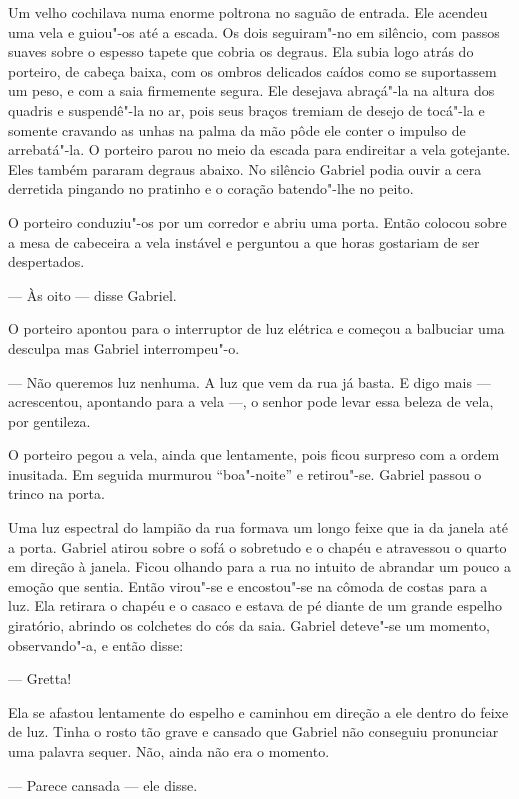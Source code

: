 Um velho cochilava numa enorme poltrona no saguão de entrada.  Ele acendeu uma
vela e guiou"-os até a escada.  Os dois seguiram"-no em silêncio, com passos
suaves sobre o espesso tapete que cobria os degraus.  Ela subia logo atrás do
porteiro, de cabeça baixa, com os ombros delicados caídos como se suportassem
um peso, e com a saia firmemente segura.  Ele desejava abraçá"-la na altura dos
quadris e suspendê"-la no ar, pois seus braços tremiam de desejo de tocá"-la e
somente cravando as unhas na palma da mão pôde ele conter o impulso de
arrebatá"-la.  O porteiro parou no meio da escada para endireitar a vela
gotejante.  Eles também pararam degraus abaixo.  No silêncio Gabriel podia
ouvir a cera derretida pingando no pratinho e o coração batendo"-lhe no peito.

O porteiro conduziu"-os por um corredor e abriu uma porta.  Então colocou sobre
a mesa de cabeceira a vela instável e perguntou a que horas gostariam de ser
despertados.

--- Às oito --- disse Gabriel.

O porteiro apontou para o interruptor de luz elétrica e começou a balbuciar uma
desculpa mas Gabriel interrompeu"-o.

--- Não queremos luz nenhuma.  A luz que vem da rua já basta.  E digo mais ---
acrescentou, apontando para a vela ---, o senhor pode levar essa beleza de
vela, por gentileza.

O porteiro pegou a vela, ainda que lentamente, pois ficou surpreso com a ordem
inusitada.  Em seguida murmurou ``boa"-noite'' e retirou"-se.  Gabriel passou o
trinco na porta.

Uma luz espectral do lampião da rua formava um longo feixe que ia da janela até
a porta.  Gabriel atirou sobre o sofá o sobretudo e o chapéu e atravessou o
quarto em direção à janela.  Ficou olhando para a rua no intuito de abrandar um
pouco a emoção que sentia.  Então virou"-se e encostou"-se na cômoda de costas
para a luz.  Ela retirara o chapéu e o casaco e estava de pé diante de um
grande espelho giratório, abrindo os colchetes do cós da saia.  Gabriel
deteve"-se um momento, observando"-a, e então disse:

--- Gretta!

Ela se afastou lentamente do espelho e caminhou em direção a ele dentro do
feixe de luz.  Tinha o rosto tão grave e cansado que Gabriel não conseguiu
pronunciar uma palavra sequer.  Não, ainda não era o momento.

--- Parece cansada --- ele disse.

